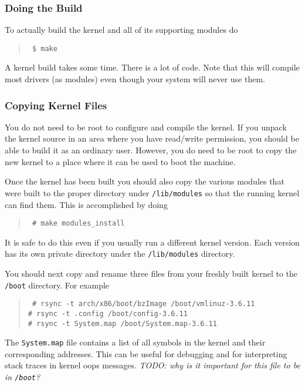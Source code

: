 \documentclass{article}
\newcommand{\filename}[1]{\texttt{#1}}   %
\newcommand{\todo}[1]{\textit{TODO: #1}}
\newenvironment{commands}
  {\begin{quote} \tt}
  {\end{quote}}
\begin{document}
\subsubsection{Doing the Build}

To actually build the kernel and all of its supporting modules do
\begin{commands}
\$ make
\end{commands}

A kernel build takes some time. There is a lot of code. Note that this will compile most drivers
(as modules) even though your system will never use them.

\subsubsection{Copying Kernel Files}

You do not need to be root to configure and compile the kernel. If you unpack the kernel source
in an area where you have read/write permission, you should be able to build it as an ordinary
user. However, you do need to be root to copy the new kernel to a place where it can be used to
boot the machine.

Once the kernel has been built you should also copy the various modules that were built to the
proper directory under \filename{/lib/modules} so that the running kernel can find them. This is
accomplished by doing
\begin{commands}
\# make modules\_install
\end{commands}

It is safe to do this even if you usually run a different kernel version. Each version has its
own private directory under the \filename{/lib/modules} directory.

You should next copy and rename three files from your freshly built kernel to the
\filename{/boot} directory. For example
\begin{commands}
\# rsync -t arch/x86/boot/bzImage /boot/vmlinuz-3.6.11 \\
\# rsync -t .config /boot/config-3.6.11 \\
\# rsync -t System.map /boot/System.map-3.6.11
\end{commands}

The \filename{System.map} file contains a list of all symbols in the kernel and their
corresponding addresses. This can be useful for debugging and for interpreting stack traces in
kernel oops messages. \todo{why is it important for this file to be in \filename{/boot}?}
\end{document}
